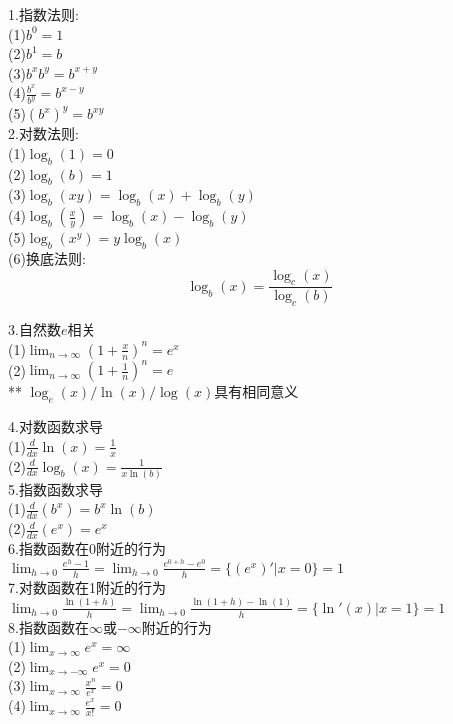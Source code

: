 \documentclass[UTF8, fontset=ubuntu]{ctexart}
\begin{document}
1.指数法则:\\
(1)\quad$b^0=1$\\
(2)\quad$b^1=b$\\
(3)\quad$b^xb^y=b^{x+y}$\\[1ex]
(4)\quad$\displaystyle\frac{b^x}{b^y}=b^{x-y}$\\[1ex]
(5)\quad$(b^x)^y=b^{xy}$\\

2.对数法则:\\
(1)\quad$\log_b(1)=0$\\
(2)\quad$\log_b(b)=1$\\
(3)\quad$\log_b(xy)=\log_b(x)+\log_b(y)$\\[1ex]
(4)\quad$\displaystyle\log_b(\frac{x}{y})=\log_b(x)-\log_b(y)$\\[1ex]
(5)\quad$\log_b(x^y)=y\log_b(x)$\\
(6)\quad 换底法则:
\[\log_b(x)=\frac{\log_c(x)}{\log_c(b)}\]

3.自然数$e$相关\\[1ex]
(1)\quad$\displaystyle\lim_{n\to\infty}(1+\frac{x}{n})^n=e^x$\\[1ex]
(2)\quad$\displaystyle\lim_{n\to\infty}(1+\frac{1}{n})^n=e$\\[1ex]
** $\log_e(x)/\ln(x)/\log(x)$具有相同意义

4.对数函数求导\\[1ex]
(1)\quad$\displaystyle\frac{d}{dx}\ln(x)=\frac{1}{x}$\\[1ex]
(2)\quad$\displaystyle\frac{d}{dx}\log_b(x)=\frac{1}{x\ln(b)}$\\[1ex]

5.指数函数求导\\[1ex]
(1)\quad$\displaystyle\frac{d}{dx}(b^x)=b^x\ln(b)$\\[1ex]
(2)\quad$\displaystyle\frac{d}{dx}(e^x)=e^x$\\[1ex]

6.指数函数在0附近的行为\\[1ex]
$\displaystyle\lim_{h\to 0}\frac{e^h-1}{h}=\lim_{h\to 0}\frac{e^{0+h}-e^0}{h}=\{(e^x)'|x=0\}=1$\\[1ex]

7.对数函数在1附近的行为\\[1ex]
$\displaystyle\lim_{h\to 0}\frac{\ln(1+h)}{h}=\lim_{h\to 0}\frac{\ln(1+h)-\ln(1)}{h}=\{\ln'(x)|x=1\}=1$\\[1ex]

8.指数函数在$\infty$或$-\infty$附近的行为\\[1ex]
(1)\quad$\displaystyle\lim_{x\to\infty}e^x=\infty$\\[1ex]
(2)\quad$\displaystyle\lim_{x\to -\infty}e^x=0$\\[1ex]
(3)\quad$\displaystyle\lim_{x\to\infty}\frac{x^n}{e^x}=0$\\[1ex]
(4)\quad$\displaystyle\lim_{x\to\infty}\frac{e^x}{x!}=0$\\[1ex]
\end{document}
